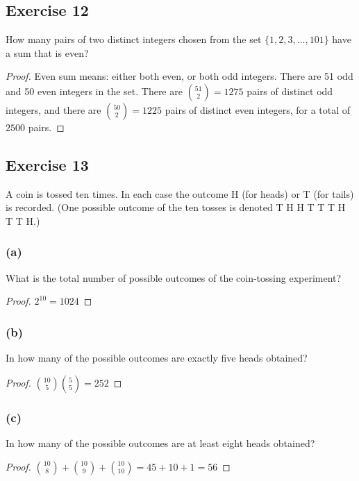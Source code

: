 \documentclass[14pt]{extarticle}
\begin{document}
\subsection{Exercise 12}
How many pairs of two distinct integers chosen from the set \(\{1, 2, 3, \ldots, 101\}\) have a sum that is even?

\begin{proof}
Even sum means: either both even, or both odd integers. There are 51 odd and 50 even integers in the set. There are 
\(\binom{51}{2} = 1275\) pairs of distinct odd integers, and there are \(\binom{50}{2} = 1225\) pairs of distinct even 
integers, for a total of \(2500\) pairs.
\end{proof}

\subsection{Exercise 13}
A coin is tossed ten times. In each case the outcome H (for heads) or T (for tails) is recorded. (One possible outcome 
of the ten tosses is denoted T H H T T T H T T H.)

\subsubsection{(a)}
What is the total number of possible outcomes of the coin-tossing experiment?

\begin{proof}
\(2^{10} = 1024\)
\end{proof}

\subsubsection{(b)}
In how many of the possible outcomes are exactly five heads obtained?

\begin{proof}
\(\binom{10}{5}\binom{5}{5} = 252\)
\end{proof}

\subsubsection{(c)}
In how many of the possible outcomes are at least eight heads obtained?

\begin{proof}
\(\binom{10}{8} + \binom{10}{9} + \binom{10}{10} = 45 + 10 + 1 = 56\)
\end{proof}
\end{document}
